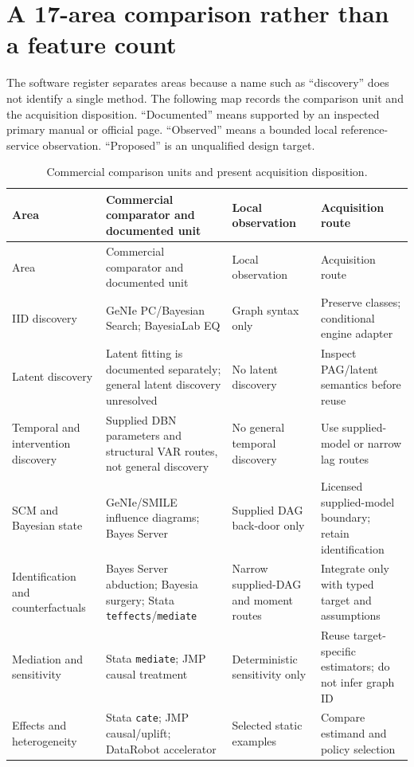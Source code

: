 \section{A 17-area comparison rather than a feature count}
\label{exec17:s8-map}

The software register separates areas because a name such as ``discovery''
does not identify a single method. The following map records the comparison
unit and the acquisition disposition. ``Documented'' means supported by an
inspected primary manual or official page. ``Observed'' means a bounded local
reference-service observation. ``Proposed'' is an unqualified design target.

\begingroup\small
\begin{longtable}{@{}P{.18\linewidth}P{.29\linewidth}P{.21\linewidth}P{.23\linewidth}@{}}
\caption{Commercial comparison units and present acquisition disposition.}
\label{exec17:s8-coverage-table}\\
\toprule
Area & Commercial comparator and documented unit & Local observation & Acquisition route \\
\midrule
\endfirsthead
\toprule
Area & Commercial comparator and documented unit & Local observation & Acquisition route \\
\midrule
\endhead
IID discovery & GeNIe PC/Bayesian Search; BayesiaLab EQ & Graph syntax only & Preserve classes; conditional engine adapter \\
Latent discovery & Latent fitting is documented separately; general latent discovery unresolved & No latent discovery & Inspect PAG/latent semantics before reuse \\
Temporal and intervention discovery & Supplied DBN parameters and structural VAR routes, not general discovery & No general temporal discovery & Use supplied-model or narrow lag routes \\
SCM and Bayesian state & GeNIe/SMILE influence diagrams; Bayes Server & Supplied DAG back-door only & Licensed supplied-model boundary; retain identification \\
Identification and counterfactuals & Bayes Server abduction; Bayesia surgery; Stata \texttt{teffects}/\texttt{mediate} & Narrow supplied-DAG and moment routes & Integrate only with typed target and assumptions \\
Mediation and sensitivity & Stata \texttt{mediate}; JMP causal treatment & Deterministic sensitivity only & Reuse target-specific estimators; do not infer graph ID \\
Effects and heterogeneity & Stata \texttt{cate}; JMP causal/uplift; DataRobot accelerator & Selected static examples & Compare estimand and policy selection \\

\end{longtable}
